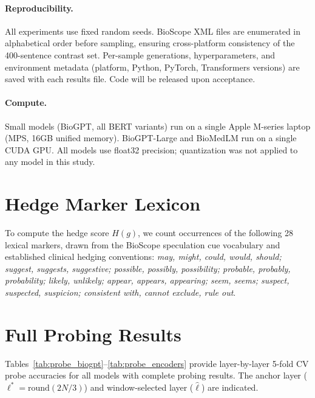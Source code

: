 \documentclass[11pt,a4paper]{article}
\begin{document}
\paragraph{Reproducibility.}
All experiments use fixed random seeds. BioScope XML files are
enumerated in alphabetical order before sampling, ensuring cross-platform
consistency of the 400-sentence contrast set. Per-sample generations,
hyperparameters, and environment metadata (platform, Python, PyTorch,
Transformers versions) are saved with each results file. Code will be
released upon acceptance.

\paragraph{Compute.}
Small models (BioGPT, all BERT variants) run on a single Apple M-series
laptop (MPS, 16GB unified memory). BioGPT-Large and BioMedLM run on a
single CUDA GPU. All models use float32 precision; quantization was not
applied to any model in this study.

\section{Hedge Marker Lexicon}
\label{app:hedge_lexicon}

To compute the hedge score $H(g)$, we count occurrences of the following
28 lexical markers, drawn from the BioScope speculation cue vocabulary
and established clinical hedging conventions:
\emph{may, might, could, would, should; suggest, suggests, suggestive;
possible, possibly, possibility; probable, probably, probability;
likely, unlikely; appear, appears, appearing; seem, seems; suspect,
suspected, suspicion; consistent with, cannot exclude, rule out}.

\section{Full Probing Results}
\label{app:probe_results}

Tables~\ref{tab:probe_biogpt}--\ref{tab:probe_encoders} provide
layer-by-layer 5-fold CV probe accuracies for all models with complete
probing results. The anchor layer ($\ell^* = \mathrm{round}(2N/3)$) and
window-selected layer ($\hat{\ell}$) are indicated.
\end{document}

